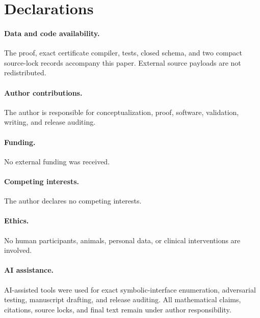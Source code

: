 \documentclass[11pt]{article}
\theoremstyle{definition}
\theoremstyle{remark}
\begin{document}
\section*{Declarations}

\paragraph{Data and code availability.}
The proof, exact certificate compiler, tests, closed schema, and two
compact source-lock records accompany this paper.  External source
payloads are not redistributed.

\paragraph{Author contributions.}
The author is responsible for conceptualization, proof, software,
validation, writing, and release auditing.

\paragraph{Funding.}
No external funding was received.

\paragraph{Competing interests.}
The author declares no competing interests.

\paragraph{Ethics.}
No human participants, animals, personal data, or clinical interventions
are involved.

\paragraph{AI assistance.}
AI-assisted tools were used for exact symbolic-interface enumeration,
adversarial testing, manuscript drafting, and release auditing.  All
mathematical claims, citations, source locks, and final text remain under
author responsibility.



\end{document}
